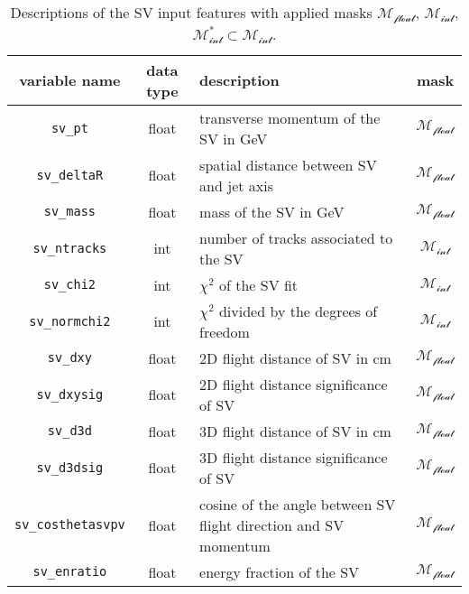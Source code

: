 \begin{table}[ht]
\centering
\caption{Descriptions of the SV input features with applied masks $\mathcal{M_{\text{float}}}$, $\mathcal{M_{\text{int}}}$, $\mathcal{M_{\text{int}}^*\subset M_{\text{int}}}$.}
\begin{tabularx}{\textwidth}{|c|c|X|c|}
\hline
\textbf{variable name} & \textbf{data type} & \textbf{description} & \textbf{mask} \\
\hline
\texttt{sv\_pt} & float & transverse momentum of the SV in GeV & \cellcolor{green!50}$\mathcal{M_{\text{float}}}$ \\
\hline
\texttt{sv\_deltaR} & float & spatial distance between SV and jet axis & \cellcolor{green!50}$\mathcal{M_{\text{float}}}$ \\
\hline
\texttt{sv\_mass} & float & mass of the SV in GeV & \cellcolor{green!50}$\mathcal{M_{\text{float}}}$ \\
\hline
\texttt{sv\_ntracks} & int & number of tracks associated to the SV & \cellcolor{red!50}$\mathcal{M_{\text{int}}}$ \\
\hline
\texttt{sv\_chi2} & int & \( \chi^2 \) of the SV fit & \cellcolor{red!50}$\mathcal{M_{\text{int}}}$ \\
\hline
\texttt{sv\_normchi2} & int & \( \chi^2 \) divided by the degrees of freedom & \cellcolor{red!50}$\mathcal{M_{\text{int}}}$ \\
\hline
\texttt{sv\_dxy} & float & 2D flight distance of SV in cm & \cellcolor{green!50}$\mathcal{M_{\text{float}}}$ \\
\hline
\texttt{sv\_dxysig} & float & 2D flight distance significance of SV & \cellcolor{green!50}$\mathcal{M_{\text{float}}}$ \\
\hline
\texttt{sv\_d3d} & float & 3D flight distance of SV in cm & \cellcolor{green!50}$\mathcal{M_{\text{float}}}$ \\
\hline
\texttt{sv\_d3dsig} & float & 3D flight distance significance of SV & \cellcolor{green!50}$\mathcal{M_{\text{float}}}$ \\
\hline
\texttt{sv\_costhetasvpv} & float & cosine of the angle between SV flight direction and SV momentum & \cellcolor{green!50}$\mathcal{M_{\text{float}}}$ \\
\hline
\texttt{sv\_enratio} & float & energy fraction of the SV & \cellcolor{green!50}$\mathcal{M_{\text{float}}}$ \\
\hline
\end{tabularx}
\label{tab:sv_input_features}
\end{table}
